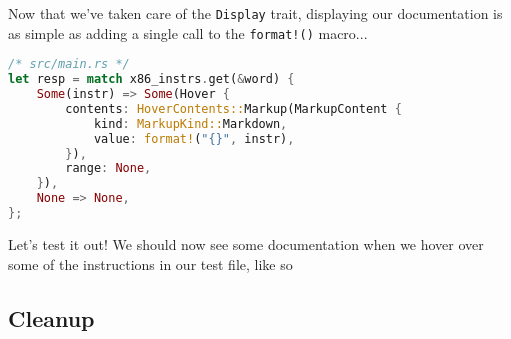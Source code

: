 Now that we've taken care of the \texttt{Display} trait, displaying our documentation is as simple as adding a single call to the \texttt{format!()} macro...

\begin{lstlisting}[language=rust]
/* src/main.rs */
let resp = match x86_instrs.get(&word) {
    Some(instr) => Some(Hover {
        contents: HoverContents::Markup(MarkupContent {
            kind: MarkupKind::Markdown,
            value: format!("{}", instr),
        }),
        range: None,
    }),
    None => None,
};
\end{lstlisting}

Let's test it out! We should now see some documentation when we hover over some of the instructions in our test file, like so





\subsection{Cleanup}

